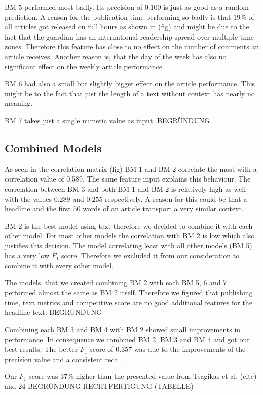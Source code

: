 BM 5 performed most badly. Its precision of $0.100$ is just as good as a random prediction. A reason for the publication time performing so badly is that $19\%$ of all articles got released on full hours as shown in (fig) and might be due to the fact that the guardian has an international readership spread over multiple time zones. Therefore this feature has close to no effect on the number of comments an article receives. Another reason is, that the day of the week has also no significant effect on the weekly article performance.

BM 6 had also a small but slightly bigger effect on the article performance. This might be to the fact that just the length of a text without context has nearly no meaning.

BM 7 takes just a single numeric value as input.
BEGRÜNDUNG

\subsection{Combined Models}
As seen in the correlation matrix (fig) BM 1 and BM 2 correlate the most with a correlation value of 0.589. The same feature input explains this behaviour. The correlation between BM 3 and both BM 1 and BM 2 is relatively high as well with the values $0.289$ and $0.255$ respectively. A reason for this could be that a headline and the first 50 words of an article transport a very similar context.

BM 2 is the best model using text therefore we decided to combine it with each other model. For most other models the correlation with BM 2 is low which also justifies this decision.
The model correlating least with all other models (BM 5) has a very low $F_1$ score. Therefore we excluded it from our consideration to combine it with every other model.

The models, that we created combining BM 2 with each BM 5, 6 and 7 performed almost the same as BM 2 itself. Therefore we figured that publishing time, text metrics and competitive score are no good additional features for the headline text.
BEGRÜNDUNG

Combining each BM 3 and BM 4 with BM 2 showed small improvements in performance. In consequence we combined BM 2, BM 3 and BM 4 and got our best results. The better $F_1$ score of $0.357$ was due to the improvements of the precision value and a consistent recall.

Our $F_1$ score was $37\%$ higher than the presented value from Tsagikas et al. (cite) and 24%
BEGRÜNDUNG  RECHTFERTIGUNG
(TABELLE)

